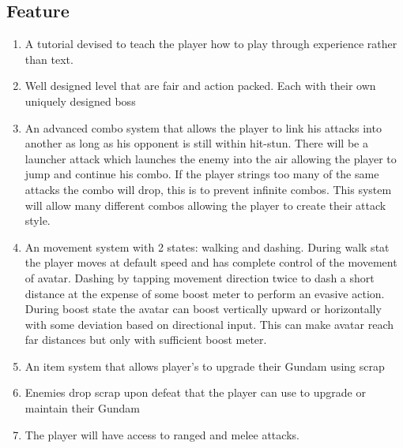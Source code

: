 \documentclass{article}
\begin{document}
\subsection*{Feature}
    \begin{enumerate}
        \item A tutorial devised to teach the player how to play through experience rather than text.
        \item Well designed level that are fair and action packed. Each with their own uniquely designed boss
        \item An advanced combo system that allows the player to link his attacks into another as long as his opponent is still within hit-stun. There will be a launcher attack which launches the enemy into the air allowing the player to jump and continue his combo. If the player strings too many of the same attacks the combo will drop, this is to prevent infinite combos. This system will allow many different combos allowing the player to create their attack style.
        \item An movement system with 2 states: walking and dashing. During walk stat the player moves at default speed and has complete control of the movement of avatar. Dashing by tapping movement direction twice to dash a short distance at the expense of some boost meter to perform an evasive action. During boost state the avatar can boost vertically upward or horizontally with some deviation based on directional input. This can make avatar reach far distances but only with sufficient boost meter.
        \item An  item system that allows player's to upgrade their Gundam using scrap 
        \item Enemies drop scrap upon defeat that the player can use to upgrade or maintain their Gundam
        \item The player will have access to ranged and melee attacks.
    \end{enumerate}
    
\end{document}

